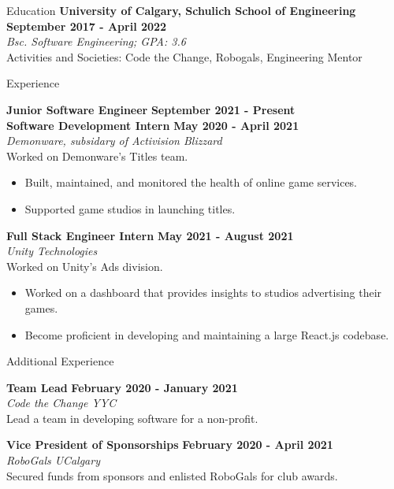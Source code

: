 \documentclass{resume} %
\begin{document}
\medskip
\begin{Entry}{Education}
{\bf University of Calgary, Schulich School of Engineering
} \hfill {\bf September 2017 - April 2022}
\\{\em Bsc. Software Engineering; GPA: 3.6}
\\ Activities and Societies: Code the Change, Robogals, Engineering Mentor
\end{Entry}

 \medskip
\begin{Entry}{Experience}

{\bf Junior Software Engineer } \hfill {\bf September 2021 - Present}
\\{\bf Software Development Intern } \hfill {\bf May 2020 - April 2021}
\\{\em Demonware, subsidary of Activision Blizzard}
\\ Worked on Demonware's Titles team.
\begin{itemize} \itemsep -5pt
  \item Built, maintained, and monitored the health of online game services.
  \item Supported game studios in launching titles.
\end{itemize}

{\bf Full Stack Engineer Intern } \hfill {\bf May 2021 - August 2021}
\\{\em Unity Technologies}
\\ Worked on Unity's Ads division.
\begin{itemize} \itemsep -5pt
  \item Worked on a dashboard that provides insights to studios advertising their games.
  \item Become proficient in developing and maintaining a large React.js codebase.
\end{itemize}

\end{Entry}

\medskip

\begin{Entry}{Additional Experience}

{\bf Team Lead } \hfill {\bf February 2020 - January 2021 }
\\{\em Code the Change YYC}
\\ Lead a team in developing software for a non-profit.

{\bf Vice President of Sponsorships} \hfill {\bf February 2020 - April 2021}
\\{\em RoboGals UCalgary}
\\ Secured funds from sponsors and enlisted RoboGals for club awards. 


\end{Entry}
\end{document}
